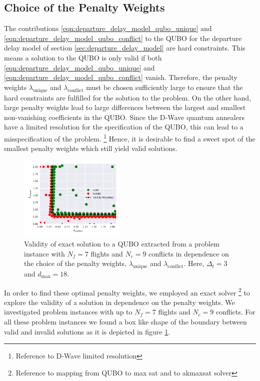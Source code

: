 \subsection{Choice of the Penalty Weights}
The contributions \eqref{eqn:departure_delay_model_qubo_unique} and \eqref{eqn:departure_delay_model_qubo_conflict} to the QUBO for the departure delay model of section \ref{sec:departure_delay_model} are hard constraints.
This means a solution to the QUBO is only valid if both \eqref{eqn:departure_delay_model_qubo_unique} and \eqref{eqn:departure_delay_model_qubo_conflict} vanish.
Therefore, the penalty weights $\lambda_\text{unique}$ and $\lambda_\text{conflict}$ must be chosen sufficiently large to ensure that the hard constraints are fulfilled for the solution to the problem.
On the other hand, large penalty weights lead to large differences between the largest and smallest non-vanishing coefficients in the QUBO.
Since the D-Wave quantum annealers have a limited resolution for the specification of the QUBO, this can lead to a misspecification of the problem. \footnote{Reference to D-Wave limited resolution}
Hence, it is desirable to find a sweet spot of the smallest penalty weights which still yield valid solutions.

\begin{figure}[htpb]
    \centering
    \includegraphics[width=0.45\textwidth,natwidth=1,natheight=0]{./pics/validity_boundary_example.pdf}
    \caption{Validity of exact solution to a QUBO extracted from a problem instance with $N_f=7$ flights and $N_c=9$ conflicts in dependence on the choice of the penalty weights, $\lambda_\text{unique}$ and $\lambda_\text{conflict}$. Here, $\Delta_t=3$ and $d_\text{max}=18$.}
    \label{fig:penalty_weights}
\end{figure}

In order to find these optimal penalty weights, we employed an exact solver \footnote{Reference to mapping from QUBO to max sat and to akmaxsat solver} to explore the validity of a solution in dependence on the penalty weights.
We investigated problem instances with up to $N_f=7$ flights and $N_c=9$ conflicts.
For all these problem instances we found a box like shape of the boundary between valid and invalid solutions as it is depicted in figure \ref{fig:penalty_weights}.

